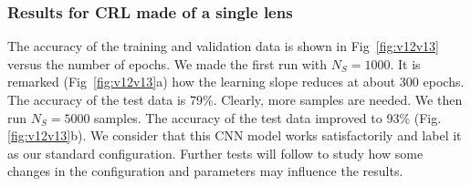 \documentclass[preprint]{iucr}
\begin{document}
 \subsubsection{Results for CRL made of a single lens}
 The accuracy of the training and validation data is shown in Fig~\ref{fig:v12v13} versus the number of epochs.
 We made the first run with $N_S=1000$.
 It is remarked (Fig~\ref{fig:v12v13}a) how the learning slope reduces at about 300 epochs. The accuracy of the test data is 79\%.
 Clearly, more samples are needed. We then run $N_S=5000$ samples. The accuracy of the test data improved to 93\% (Fig.\ref{fig:v12v13}b).
 We consider that this CNN model works satisfactorily and label it as our standard configuration. Further tests will follow to study how some changes in the configuration and parameters may influence the results.
\end{document}
